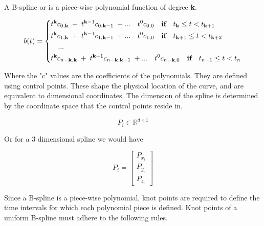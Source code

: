 \documentclass{article}
\begin{document}
 A B-spline or  is a piece-wise polynomial function of degree \textbf{k}.
 
  \hspace{1cm}
  
 \begin{equation}
     b(t) = \begin{dcases} 
                t^{\textbf{\textbf{k}}}c_{0,\textbf{k}} \; + \; t^{\textbf{k}-1}c_{0,\textbf{k}-1} \; + ... \quad t^{0}c_{0,0} \quad \textbf{if} \quad t_{\textbf{k}} \leq t < t_{\textbf{k}+1} \\ 
                t^{\textbf{k}}c_{1,\textbf{k}} \; + \; t^{\textbf{k}-1}c_{1,\textbf{k}-1} \; + ... \quad t^{0}c_{1,0} \quad \textbf{if} \quad t_{\textbf{k}+1} \leq t < t_{\textbf{k}+2} \\
                \quad ... \\
                t^{\textbf{k}}c_{n-\textbf{k},\textbf{k}} \; + \; t^{\textbf{k}-1}c_{n-\textbf{k},\textbf{k}-1} \; + ... \quad t^{0}c_{n-\textbf{k},0} \quad \textbf{if} \quad t_{n-1} \leq t < t_{n}
            \end{dcases} 
 \end{equation}
 
 \hspace{1cm}
 
 Where the "c" values are the coefficients of the polynomials. They are defined using control points. These shape the physical location of the curve, and are equivalent to  dimensional coordinates. The dimension of the spline is determined by the coordinate space that the control points reside in.
 
 \begin{equation}
     P_i \in \mathbb{R}^{d \times 1}
 \end{equation}
 
 Or for a 3 dimensional spline we would have
 
  \begin{equation}
     P_i = \begin{bmatrix} P_{x_i} \\ P_{y_i} \\ P_{z_i} \end{bmatrix}
 \end{equation}

Since a B-spline is a piece-wise polynomial, knot points are required to define the time intervals for which each polynomial piece is defined. Knot points of a uniform B-spline must adhere to the following rules.
\end{document}
